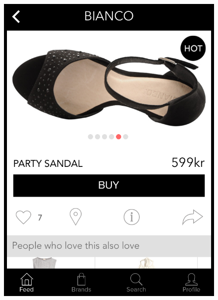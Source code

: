 \begin{figure}[H]
    \centering
    \begin{minipage}{.30\linewidth}
          \includegraphics[height=1.5\linewidth]{image/SoBazaarproduct.png}
    \end{minipage}
    \hspace{.02\linewidth}
    \begin{minipage}{.3\linewidth}

\end{minipage}
\end{figure}
